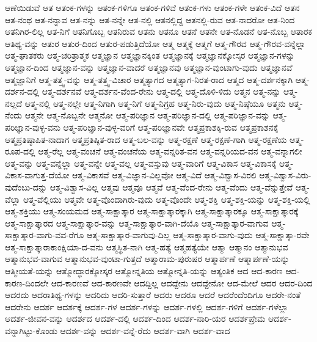 {ಆಣೆಯಿಡುವೆ
ಆತ
ಆತಂಕ-ಗಳನ್ನು
ಆತಂಕ-ಗಳಿಗೂ
ಆತಂಕ-ಗಳಿವೆ
ಆತಂಕ-ಗಳು
ಆತಂಕ-ಗಳೇ
ಆತಂಕ-ವಿದೆ
ಆತನ
ಆತ-ನಂಥ
ಆತ-ನನ್ನಾವ
ಆತ-ನನ್ನು
ಆತ-ನನ್ನೇ
ಆತ-ನಲ್ಲಿ
ಆತನಲ್ಲಿದ್ದ
ಆತನಲ್ಲಿ-ರುವ
ಆತ-ನಾದರೋ
ಆತ-ನಿಂದ
ಆತನಿಗಿರ-ಲಿಲ್ಲ
ಆತ-ನಿಗೆ
ಆತನಿಗೊಬ್ಬ
ಆತನಿರುವ
ಆತನು
ಆತನೂ
ಆತನೆ
ಆತನೇ
ಆತ-ನೊಡನೆ
ಆತ-ನೊಬ್ಬ
ಆತಾರಕ
ಆತಿಥ್ಯ-ವನ್ನು
ಆತುರ
ಆತುರ-ದಿಂದ
ಆತುರ-ಪಡುತ್ತಿದೆಯೋ
ಆತ್ಮ
ಆತ್ಮಕ್ಕೆ
ಆತ್ಮಗೆ
ಆತ್ಮ-ಗೌರವ
ಆತ್ಮ-ಗೌರವ-ವನ್ನೆಲ್ಲಾ
ಆತ್ಮ-ಘಾತಕರು
ಆತ್ಮ-ಚರಿತ್ರಾತ್ಮಕ
ಆತ್ಮಜ್ಞಾನ
ಆತ್ಮಜ್ಞಾನಕ್ಕಿಂತ
ಆತ್ಮಜ್ಞಾನಕ್ಕೆ
ಆತ್ಮಜ್ಞಾನಕ್ಕೋಸ್ಕರ
ಆತ್ಮಜ್ಞಾನ-ಗಳನ್ನು
ಆತ್ಮಜ್ಞಾನ-ದಿಂದ
ಆತ್ಮಜ್ಞಾನ-ವನ್ನು
ಆತ್ಮಜ್ಞಾನ-ವಾದರೆ
ಆತ್ಮಜ್ಞಾನವು
ಆತ್ಮಜ್ಞಾನ-ವುಂಟಾಗು-ವುದು
ಆತ್ಮಜ್ಞಾನವೆ
ಆತ್ಮಜ್ಞಾನಿಗೆ
ಆತ್ಮ-ತತ್ತ್ವ-ವನ್ನು
ಆತ್ಮ-ತತ್ತ್ವ-ವಿಚಾರ
ಆತ್ಮತ್ಯಾಗದ
ಆತ್ಮತ್ಯಾಗ-ನಿರತ-ರಾದ
ಆತ್ಮದ
ಆತ್ಮ-ದರ್ಶನಕ್ಕಾಗಿ
ಆತ್ಮ-ದರ್ಶನ-ದಲ್ಲಿ
ಆತ್ಮ-ದರ್ಶನವೆ
ಆತ್ಮ-ದರ್ಶನ-ವೆಂದ-ರೇನು
ಆತ್ಮ-ದಲ್ಲಿ
ಆತ್ಮ-ದೊಳಿ-ಳಿದು
ಆತ್ಮನ
ಆತ್ಮ-ನನ್ನು
ಆತ್ಮ-ನಲ್ಲದೆ
ಆತ್ಮ-ನಲ್ಲಿ
ಆತ್ಮ-ನಲ್ಲೇ
ಆತ್ಮ-ನಿಗಾಗಿ
ಆತ್ಮ-ನಿಗೆ
ಆತ್ಮ-ನಿಗ್ರಹ
ಆತ್ಮ-ನಿರು-ವುದು
ಆತ್ಮ-ನಿಷ್ಠೆಯೂ
ಆತ್ಮನು
ಆತ್ಮ-ನೆಂದು
ಆತ್ಮನೇ
ಆತ್ಮ-ನೊಬ್ಬನೇ
ಆತ್ಮನೋ
ಆತ್ಮ-ಪರಿಜ್ಞಾನ
ಆತ್ಮ-ಪರಿಜ್ಞಾನ-ದಲ್ಲಿ
ಆತ್ಮ-ಪರಿಜ್ಞಾನ-ವನ್ನು
ಆತ್ಮ-ಪರಿಜ್ಞಾನ-ವುಳ್ಳ-ವನು
ಆತ್ಮ-ಪರಿಜ್ಞಾನ-ವುಳ್ಳ-ವರಿಗೆ
ಆತ್ಮ-ಪರಿಜ್ಞಾನವೇ
ಆತ್ಮಪ್ರಕಾಶಕ್ಕಿ-ರುವ
ಆತ್ಮಪ್ರಕಾಶನಕ್ಕೆ
ಆತ್ಮಪ್ರತಿಷ್ಠಾಪಿತ-ನಾದಾಗ
ಆತ್ಮಪ್ರತಿಷ್ಠಿತ-ರಾದ
ಆತ್ಮ-ಬಲ-ವನ್ನು
ಆತ್ಮ-ರಕ್ಷಣೆ
ಆತ್ಮ-ರಕ್ಷಣೆ-ಗಾಗಿ
ಆತ್ಮ-ರಕ್ಷಣೆಯ
ಆತ್ಮ-ರೂಪ-ದಲ್ಲಿ
ಆತ್ಮ-ರೆಲ್ಲ
ಆತ್ಮ-ವಂಚನೆ
ಆತ್ಮ-ವಂಚನೆಯ
ಆತ್ಮ-ವನ್ನರಿತ-ವನ
ಆತ್ಮ-ವನ್ನರಿಯದ-ವನ
ಆತ್ಮ-ವನ್ನಾಗಲೀ
ಆತ್ಮ-ವನ್ನು
ಆತ್ಮ-ವನ್ನೆಲ್ಲಾ
ಆತ್ಮ-ವನ್ನೇ
ಆತ್ಮ-ವಲ್ಲ
ಆತ್ಮ-ವಸ್ತುವು
ಆತ್ಮ-ವಾರಿಗೆ
ಆತ್ಮ-ವಿಕಾಸ
ಆತ್ಮ-ವಿಕಾಸಕ್ಕೆ
ಆತ್ಮ-ವಿಕಾಸ-ವಾಗುತ್ತ-ದೆಯೋ
ಆತ್ಮ-ವಿಕಾಸವೆ
ಆತ್ಮ-ವಿಜ್ಞಾನ-ವಿಲ್ಲವೋ
ಆತ್ಮ-ವಿದೆ
ಆತ್ಮ-ವಿಶ್ವಾಸ-ವಿರಲಿ
ಆತ್ಮ-ವಿಶ್ವಾಸ-ವಿರು-ವುದೆಂಬು-ದನ್ನು
ಆತ್ಮ-ವಿಶ್ವಾಸ-ವಿಲ್ಲ
ಆತ್ಮವು
ಆತ್ಮವೂ
ಆತ್ಮವೆ
ಆತ್ಮ-ವೆಂದ-ರೇನು
ಆತ್ಮ-ವೆಂದು
ಆತ್ಮ-ವೆನ್ನುತ್ತೇವೆ
ಆತ್ಮ-ವೆಲ್ಲಾ
ಆತ್ಮ-ವೆಲ್ಲಿಯು
ಆತ್ಮವೇ
ಆತ್ಮ-ವೊಂದಾಗಿರು-ವುದು
ಆತ್ಮ-ವೊಂದೇ
ಆತ್ಮ-ಶಕ್ತಿ
ಆತ್ಮ-ಶಕ್ತಿ-ಯನ್ನು
ಆತ್ಮ-ಶಕ್ತಿ-ಯಲ್ಲಿ
ಆತ್ಮ-ಶಕ್ತಿಯು
ಆತ್ಮ-ಸಂಯಮದ
ಆತ್ಮ-ಸಾಕ್ಷಾತ್ಕಾರ
ಆತ್ಮ-ಸಾಕ್ಷಾತ್ಕಾರಕ್ಕಾಗಿ
ಆತ್ಮ-ಸಾಕ್ಷಾತ್ಕಾರಕ್ಕೂ
ಆತ್ಮ-ಸಾಕ್ಷಾತ್ಕಾರಕ್ಕೆ
ಆತ್ಮ-ಸಾಕ್ಷಾತ್ಕಾರದ
ಆತ್ಮ-ಸಾಕ್ಷಾತ್ಕಾರ-ವನ್ನು
ಆತ್ಮ-ಸಾಕ್ಷಾತ್ಕಾರ-ವಾಗಿ-ದೆಯೊ
ಆತ್ಮ-ಸಾಕ್ಷಾತ್ಕಾರ-ವಾಗುವ
ಆತ್ಮ-ಸಾಕ್ಷಾತ್ಕಾರ-ವಾಗು-ವವ-ರೆಗೂ
ಆತ್ಮ-ಸಾಕ್ಷಾತ್ಕಾರ-ವಾಗುವು-ದಿಲ್ಲ
ಆತ್ಮ-ಸಾಕ್ಷಾತ್ಕಾರ-ವಾಗು-ವುದು
ಆತ್ಮ-ಸಾಕ್ಷಾತ್ಕಾ-ರವೇ
ಆತ್ಮ-ಸಾಕ್ಷಾತ್ಕಾರಾಕಾಂಕ್ಷಿಯಾ-ದ-ವನು
ಆತ್ಮಸ್ಥಿತ-ನಾಗಿ
ಆತ್ಮ-ಹತ್ಯೆ
ಆತ್ಮಹತ್ಯೆಯೇ
ಆತ್ಮಾ
ಆತ್ಮಾನಂ
ಆತ್ಮಾನುಭವ
ಆತ್ಮಾನುಭವ-ವಾಗುವ
ಆತ್ಮಾನುಭವ-ವುಂಟಾ-ಗುತ್ತದೆ
ಆತ್ಮಾರಾಮ-ಪುರುಷರ
ಆತ್ಮಾರ್ಪಣೆ
ಆತ್ಮಾರ್ಪಣೆ-ಯನ್ನು
ಆತ್ಮೀಯತೆ-ಯನ್ನು
ಆತ್ಮೋದ್ಧಾರಕ್ಕೋಸ್ಕರ
ಆತ್ಮೋನ್ನತಿಯ
ಆತ್ಮೋನ್ನತಿ-ಯನ್ನು
ಆತ್ಯಂತಿಕ
ಆದ
ಆದ-ಕಾರಣ
ಆದ-ಕಾರಣ-ದಿಂದಲೇ
ಆದ-ಕಾರಣವೆ
ಆದ-ಕಾರಣವೇ
ಆದದ್ದಿಲ್ಲ
ಆದದ್ದೇನು
ಆದದ್ದೇನೋ
ಆದ-ಮೇಲೆ
ಆದರ
ಆದರ-ದಿಂದ
ಆದರದು
ಆದರಾತಿಥ್ಯ-ಗಳನ್ನು
ಆದರಿದು
ಆದರಿ-ಸುತ್ತಾರೆ
ಆದರು
ಆದರೂ
ಆದರೆ
ಆದರೆಂದೆಂದಿಗೂ
ಆದರೇ-ನಂತೆ
ಆದರೇನು
ಆದರ್ಶ
ಆದರ್ಶಕ್ಕೆ
ಆದರ್ಶ-ಗಳ
ಆದರ್ಶ-ಗಳನ್ನು
ಆದರ್ಶ-ಗಳಲ್ಲಿ
ಆದರ್ಶ-ಗಳಿಗೆ
ಆದರ್ಶ-ಗಳೆಲ್ಲಾ
ಆದರ್ಶ-ಜೀವನ-ವನ್ನು
ಆದರ್ಶದ
ಆದರ್ಶ-ದಲ್ಲಿ
ಆದರ್ಶ-ದಿಂದ
ಆದರ್ಶ-ನಾರಿ-ಯರ
ಆದರ್ಶಪ್ರೇಮ
ಆದರ್ಶ-ವನ್ನಾಗಿಟ್ಟು-ಕೊಂಡು
ಆದರ್ಶ-ವನ್ನು
ಆದರ್ಶ-ವನ್ನೆ-ರೆದು
ಆದರ್ಶ-ವಾಗಿ
ಆದರ್ಶ-ವಾದ
}
